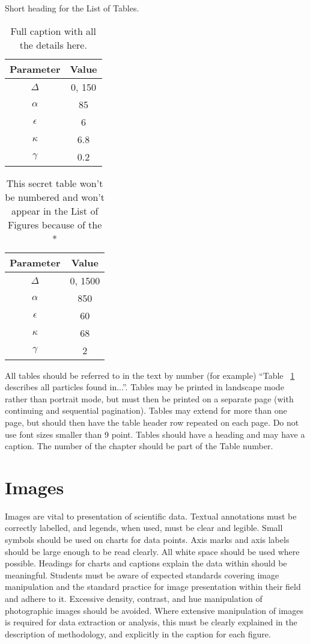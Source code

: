 \begin{table} 
\center
\caption{Short heading for the List of Tables.}
\begin{tabular}{c|c}
Parameter & Value \\ \hline \hline
$\Delta$ & 0, 150 \\
${\alpha}$ & 85 \\
${\epsilon}$ & 6 \\
${\kappa}$ & 6.8 \\
${\gamma}$ & 0.2
\end{tabular}
\label{tab-values}
\caption*{Full caption with all the details here.}
\end{table}

\begin{table} \center
\begin{tabular}{c|c}
Parameter & Value \\ \hline \hline
$\Delta$ & 0, 1500 \\
${\alpha}$ & 850 \\
${\epsilon}$ & 60 \\
${\kappa}$ & 68 \\
${\gamma}$ & 2
\end{tabular}
\caption*{This secret table won't be numbered and won't appear in the List of Figures because of the * }
\end{table}

All tables should be referred to in the text by number (for example) ``Table ~\ref{tab-values} describes all particles found in...''.  Tables may be printed in landscape mode rather than portrait mode, but must then be printed on a separate page (with continuing and sequential pagination). Tables may extend for more than one page, but should then have the table header row repeated on each page. Do not use font sizes smaller than 9 point. Tables should have a heading and may have a caption.  The number of the chapter should be part of the Table number.


\section{Images}

Images are vital to presentation of scientific data.  Textual annotations must be correctly labelled, and legends, when used, must be clear and legible.  Small symbols should be used on charts for data points.  Axis marks and axis labels should be large enough to be read clearly.  All white space should be used where possible.  Headings for charts and captions explain the data within should be meaningful.  Students must be aware of expected standards covering image manipulation and the standard practice for image presentation within their field and adhere to it.  Excessive density, contrast, and hue manipulation of photographic images should be avoided.  Where extensive manipulation of images is required for data extraction or analysis, this must be clearly explained in the description of methodology, and explicitly in the caption for each figure.